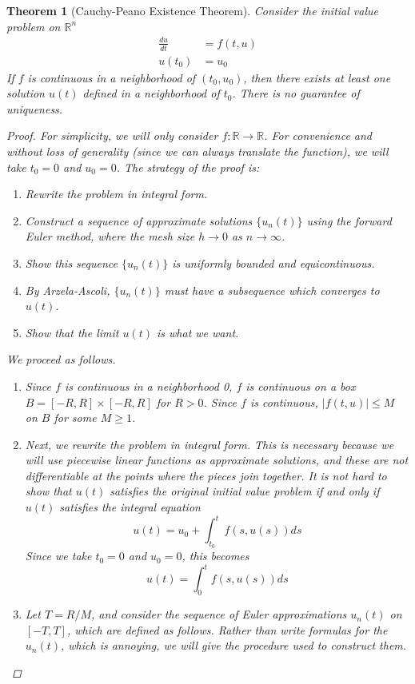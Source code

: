 \documentclass[10pt]{article}         %
\newtheorem{theorem}{Theorem}[section]
\theoremstyle{remark}
\newcommand{\R}{\mathbb{R}}
\begin{document}
\begin{theorem}[Cauchy-Peano Existence Theorem]
Consider the initial value problem on $\R^n$
\begin{align*}
\frac{du}{dt} &= f(t, u) \\
u(t_0) &= u_0
\end{align*}
If $f$ is continuous in a neighborhood of $(t_0, u_0)$, then there exists at least one solution $u(t)$ defined in a neighborhood of $t_0$. There is no guarantee of uniqueness.
\begin{proof}
For simplicity, we will only consider $f: \R \rightarrow \R$. For convenience and without loss of generality (since we can always translate the function), we will take $t_0 = 0$ and $u_0 = 0$. The strategy of the proof is:
\begin{enumerate}
    \item Rewrite the problem in integral form.
	\item Construct a sequence of approximate solutions $\{ u_n(t) \}$ using the forward Euler method, where the mesh size $h \rightarrow 0$ as $n \rightarrow \infty$.
	\item Show this sequence $\{ u_n(t) \}$ is uniformly bounded and equicontinuous.
	\item By Arzela-Ascoli, $\{ u_n(t) \}$ must have a subsequence which converges to $u(t)$.
	\item Show that the limit $u(t)$ is what we want.
\end{enumerate}
We proceed as follows.
\begin{enumerate}
    \item Since $f$ is continuous in a neighborhood 0, $f$ is continuous on a box $B = [-R, R] \times [-R, R]$ for $R > 0$. Since $f$ is continuous, $|f(t, u)| \leq M$ on $B$ for some $M \geq 1$.
    \item Next, we rewrite the problem in integral form. This is necessary because we will use piecewise linear functions as approximate solutions, and these are not differentiable at the points where the pieces join together. It is not hard to show that $u(t)$ satisfies the original initial value problem if and only if $u(t)$ satisfies the integral equation
    \[
    u(t) = u_0 + \int_{t_0}^t f(s, u(s))ds
    \]
    Since we take $t_0 = 0$ and $u_0 = 0$, this becomes
    \[
    u(t) = \int_0^t f(s, u(s))ds
    \]
    \item Let $T = R/M$, and consider the sequence of Euler approximations $u_n(t)$ on $[-T, T]$, which are defined as follows. Rather than write formulas for the $u_n(t)$, which is annoying, we will give the procedure used to construct them.

\end{enumerate}
\end{proof}
\end{theorem}
\end{document}

